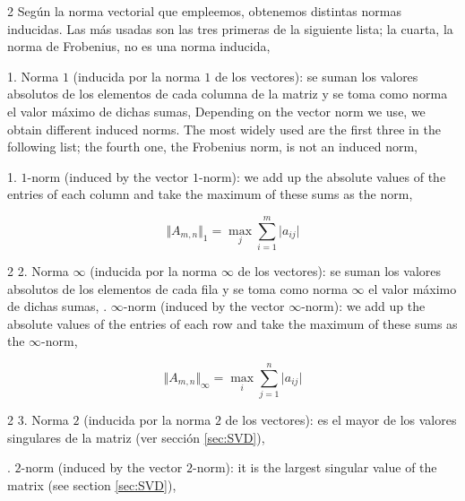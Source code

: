 \begin{paracol}{2}
Según la norma vectorial que empleemos, obtenemos distintas normas inducidas. Las más usadas son las tres primeras de la siguiente lista; la cuarta, la norma de Frobenius, no es una norma inducida,

1. Norma $1$ (inducida por la norma $1$ de los vectores): se suman los valores absolutos de los elementos de cada columna de la matriz y se toma como norma el valor máximo de dichas sumas,
\switchcolumn
Depending on the vector norm we use, we obtain different induced norms. The most widely used are the first three in the following list; the fourth one, the Frobenius norm, is not an induced norm,

1. $1$-norm (induced by the vector $1$-norm): we add up the absolute values of the entries of each column and take the maximum of these sums as the norm,
\end{paracol}
\begin{equation*}
\Vert A_{m,n} \Vert _{1} = \max_j \sum_{i=1}^m \vert a_{ij}\vert
\end{equation*}
\begin{paracol}{2}
2. Norma $\infty$ (inducida por la norma $\infty$ de los vectores): se suman los valores absolutos de los elementos de cada fila y se toma como norma $\infty$ el valor máximo de dichas sumas,
. $\infty$-norm (induced by the vector $\infty$-norm): we add up the absolute values of the entries of each row and take the maximum of these sums as the $\infty$-norm,
\end{paracol}
\begin{equation*}
\Vert A_{m,n} \Vert _{\infty} = \max_i \sum_{j=1}^n \vert a_{ij}\vert
\end{equation*}
\begin{paracol}{2}
3. Norma $2$ (inducida por la norma $2$ de los vectores): es el mayor de los valores singulares de la matriz (ver sección \ref{sec:SVD}),

. $2$-norm (induced by the vector $2$-norm): it is the largest singular value of the matrix (see section \ref{sec:SVD}), 
\end{paracol}


